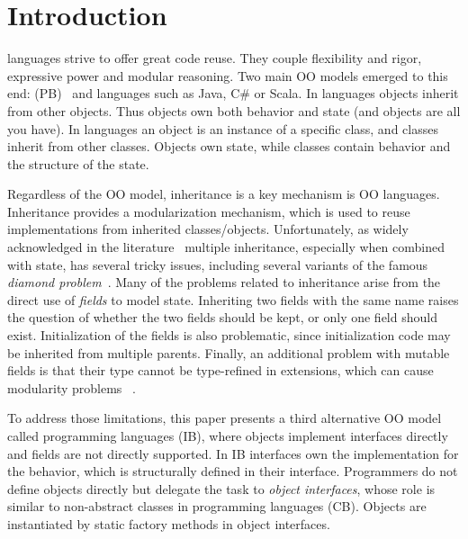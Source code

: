 \section{Introduction}\label{sec:intro}

\Objectoriented languages strive to offer great code reuse.
They couple flexibility and rigor, expressive power and
modular reasoning.  Two main OO models emerged to this end:
\prototypebased (PB)~\cite{Ungar87self} and \classbased languages such as
Java, C\# or Scala.  In \prototypebased
languages objects inherit from other objects. Thus objects own
both behavior and state (and objects are all you have).
In \classbased languages an object is an instance of a specific class,
and classes inherit from other classes.  Objects own state,
while classes contain behavior and the structure of the state.

Regardless of the OO model, inheritance is a key mechanism is OO
languages. Inheritance provides a modularization mechanism, which
is used to reuse implementations from inherited classes/objects.
Unfortunately, as widely acknowledged in the literature~\cite{scharli03traits,Sak89dis,bracha90mixin,malayeri2009cz}
multiple inheritance, especially when combined with state, has several
tricky issues, including several variants of the famous
\emph{diamond problem}~\cite{bracha90mixin,Sak89dis}. Many of the problems related to
inheritance arise from the direct use of \emph{fields} to model state.
Inheriting two fields with the same name raises
the question of whether the two fields should be kept, or only one
field should exist. Initialization
of the fields is also problematic, since initialization code may be inherited from
multiple parents. Finally, an additional problem with mutable fields is that their
type cannot be type-refined in extensions, which can cause modularity problems
~\cite{wadler98expression,eptrivially}.

To address those limitations, this paper presents a third alternative
OO model called \emph{\interfacebased} \objectoriented programming
languages (IB), where objects implement interfaces directly and fields
are not directly supported. In IB interfaces own the implementation for the
behavior, which is structurally defined in their
interface. Programmers do not define objects directly but delegate the
task to \emph{object interfaces}, whose role is similar to
non-abstract classes in \classbased \objectoriented programming
languages (CB). Objects are instantiated by static factory methods in
object interfaces.

